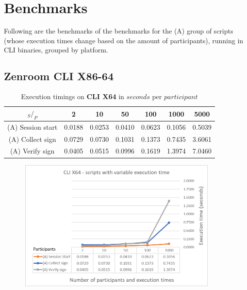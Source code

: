 \documentclass[twocolumn]{article}
\begin{document}

\onecolumn

\section{Benchmarks}
\label{sec:benchmarks}

Following are the benchmarks of the benchmarks for the (A) group of scripts (whose execution times change based on the amount of participants), running in CLI binaries, grouped by platform.


\subsection*{Zenroom CLI X86-64}


\begin{table}[h!]
  \begin{center}
    \caption{Execution timings on \textbf{CLI X64} in $seconds$ per $participant$}
      \label{tab:table1}
        \begin{tabular} {c|c|c|c|c|c|c}
          \toprule
           \textbf{$_S / _P$} & \textbf{2} & \textbf{10} & \textbf{50} & \textbf{100} & \textbf{1000} & \textbf{5000} \\
          \midrule
          (A) Session start & 0.0188 & 0.0253 & 0.0410 & 0.0623 & 0.1056 & 0.5039 \\
          (A) Collect sign & 0.0729 & 0.0730 & 0.1031 & 0.1373 & 0.7435 & 3.6061 \\
          (A) Verify sign & 0.0405 & 0.0515 & 0.0996 & 0.1619 & 1.3974 & 7.0460 \\
      \bottomrule %
    \end{tabular}
  \end{center}
\end{table}


\begin{figure}[h!]
    \centering
    \includegraphics[width=4in, height=2.6in]{graphs/CLIX64.png}
    \label{fig:galaxy}
\end{figure}
\end{document}
